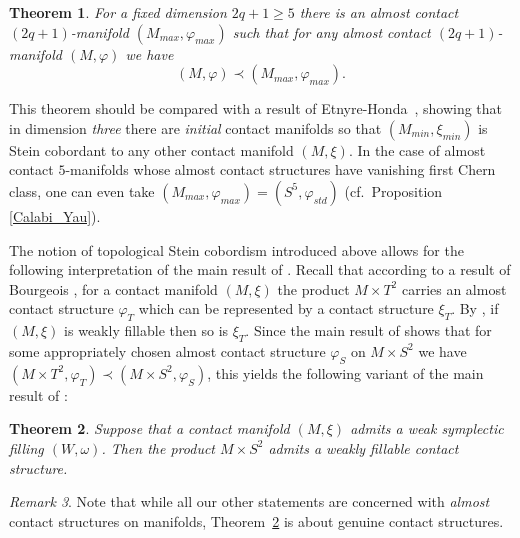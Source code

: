 \documentclass[12pt]{amsart}
\newtheorem{Theorem}{Theorem}[section]
\theoremstyle{remark}
\newtheorem{Remark}[Theorem]{Remark}
\begin{document}
\begin{Theorem}\label{thm:maximalelement}
For a fixed dimension $2q{+}1\geq 5$ there is an almost contact
$(2q{+}1)$-manifold $(M _{max}, \varphi _{max})$ such that for any
almost contact $(2q{+}1)$-manifold $(M, \varphi )$ we have
\[
(M,\varphi ) \prec (M_{max},\varphi_{max}).
\]
\end{Theorem}
\noindent This theorem should be compared with a result of
Etnyre-Honda~\cite{EtHond}, showing that in dimension \emph{three} there are \emph{initial} contact manifolds so that $(M_{min}, \xi _{min})$ is
Stein cobordant to any other contact manifold $(M, \xi )$. In the case
of almost contact $5$-manifolds whose almost contact structures have
vanishing first Chern class, one can even take
$(M_{max},\varphi_{max}) = (S^5,\varphi_{std})$ (cf.\ Proposition
\ref{Calabi_Yau}).

The notion of topological Stein cobordism introduced above
allows for the following interpretation of the main result of \cite{BCS1}.
 Recall that according to a result of Bourgeois \cite{Bou},  
for a
contact manifold $(M, \xi )$ the product $M\times T^2$ carries an 
almost contact structure $\varphi _{T}$ which can be represented by a contact
structure $\xi _{T}$. By \cite[Example~5]{Massot12}, if $(M, \xi )$ is weakly fillable
then so is $\xi _{T}$. Since the main result of 
\cite{BCS1} shows that for some appropriately chosen almost contact structure
$\varphi _{S}$ on $M\times S^2$ we have 
$(M\times T^2,  \varphi _T) \prec (M\times S^2, \varphi _S)$, this yields
the following
variant of the main result of \cite{BCS1}:

\begin{Theorem}\label{thm:mandmtimess2}
Suppose that a contact manifold $(M, \xi )$ %
admits a weak symplectic filling $(W, \omega )$.
Then the product $M\times S^2$ admits a
weakly fillable contact structure.
\end{Theorem}

\begin{Remark}
Note that while all our other statements are concerned with 
\emph{almost} contact structures on manifolds, Theorem~\ref{thm:mandmtimess2}
is about genuine contact structures.
\end{Remark}

\begin{comment}
Using the obstruction class introduced in \cite{BCS2}, we can show that certain
almost contact manifolds do not admit compatible Stein fillable
contact structures.  As an example, we show that the connected sum of
two (high dimensional) almost contact manifolds might admit a Stein
fillable contact structure even if none of the components do.  To put
this result in perspective, recall that 
\end{comment}
\end{document}
